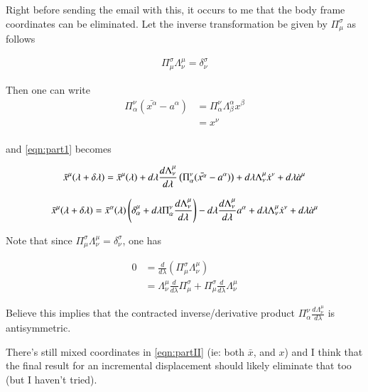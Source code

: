 \documentclass{article}
\begin{document}
Right before sending the email with this, it occurs to me that the body frame coordinates can be eliminated.  Let the inverse transformation be given by $\Pi^\sigma_\mu$ as follows

\begin{align*}
\Pi^\sigma_\mu \Lambda^\mu_\nu = \delta^\sigma_\nu
\end{align*}

Then one can write
\begin{align*}
\Pi^\nu_\alpha(\bar{x^\alpha} - a^\alpha)
&= \Pi^\nu_\alpha \Lambda^\alpha_\beta x^\beta  \\
&= x^\nu  \\
\end{align*}

and \ref{eqn:part1} becomes

\begin{align*}
\bar{x}^\mu(\lambda + \delta\lambda) 
&= 
\bar{x}^\mu(\lambda)
+ d\lambda \frac{d \Lambda^\mu_\nu}{d\lambda} \left( \Pi^\nu_\alpha(\bar{x^\alpha} - a^\alpha) \right)
+ d\lambda \Lambda^\mu_\nu \dot{x}^\nu
+ d\lambda \dot{a}^\mu \\
\end{align*}

\begin{align}\label{eqn:partII}
\bar{x}^\mu(\lambda + \delta\lambda) 
&= 
\bar{x}^\alpha(\lambda) \left( \delta^\mu_\alpha + d\lambda \Pi^\nu_\alpha \frac{d \Lambda^\mu_\nu}{d\lambda} \right)
- d\lambda \frac{d \Lambda^\mu_\nu}{d\lambda} a^\alpha
+ d\lambda \Lambda^\mu_\nu \dot{x}^\nu
+ d\lambda \dot{a}^\mu \\
\end{align}

Note that since $\Pi^\sigma_\mu \Lambda^\mu_\nu = \delta^\sigma_\nu$, one has

\begin{align*}
0 
&= \frac{d}{d\lambda} \left( \Pi^\sigma_\mu \Lambda^\mu_\nu \right) \\
&= \Lambda^\mu_\nu \frac{d}{d\lambda} \Pi^\sigma_\mu + \Pi^\sigma_\mu \frac{d}{d\lambda} \Lambda^\mu_\nu 
\end{align*}

Believe this implies that the contracted inverse/derivative product $\Pi^\nu_\alpha \frac{d \Lambda^\mu_\nu}{d\lambda}$ is antisymmetric.

There's still mixed coordinates in \ref{eqn:partII} (ie: both $\bar{x}$, and $x$) and I think that the final result for an incremental displacement
should likely eliminate that too (but I haven't tried).

%

%
%
\end{document}
